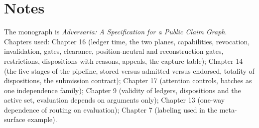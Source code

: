 \documentclass[11pt]{article}
\begin{document}

\section*{Notes}

The monograph is \emph{Adversaria: A Specification for a Public Claim Graph}. Chapters used: Chapter 16 (ledger time, the two planes, capabilities, revocation, invalidation, gates, clearance, position-neutral and reconstruction gates, restrictions, dispositions with reasons, appeals, the capture table); Chapter 14 (the five stages of the pipeline, stored versus admitted versus endorsed, totality of dispositions, the submission contract); Chapter 17 (attention controls, batches as one independence family); Chapter 9 (validity of ledgers, dispositions and the active set, evaluation depends on arguments only); Chapter 13 (one-way dependence of routing on evaluation); Chapter 7 (labeling used in the meta-surface example).
\end{document}
